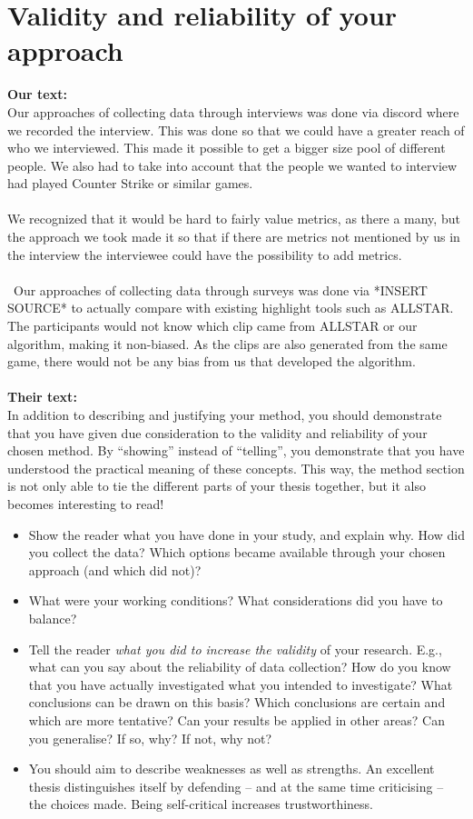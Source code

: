 \documentclass[a4paper,twoside]{bth}
\begin{document}
\section{Validity and reliability of your approach}
\textbf{Our text:}\\
Our approaches of collecting data through interviews was done via discord where we recorded the interview. This was done so that we could have a greater reach of who we interviewed. This made it possible to get a bigger size pool of different people. We also had to take into account that the people we wanted to interview had played Counter Strike or similar games.\\\\ We recognized that it would be hard to fairly value metrics, as there a many, but the approach we took made it so that if there are metrics not mentioned by us in the interview the interviewee could have the possibility to add metrics.   \\\\\
Our approaches of collecting data through surveys was done via *INSERT SOURCE* to actually compare with existing highlight tools such as ALLSTAR. The participants would not know which clip came from ALLSTAR or our algorithm, making it non-biased. As the clips are also generated from the same game, there would not be any bias from us that developed the algorithm. 
\\\\
\textbf{Their text:}\\
In addition to describing and justifying your method, you should demonstrate that you have given due consideration to the validity and reliability of your chosen method. By ``showing'' instead of ``telling'', you demonstrate that you have understood the practical meaning of these concepts. This way, the method section is not only able to tie the different parts of your thesis together, but it also becomes interesting to read!


\begin{itemize}
    \item Show the reader what you have done in your study, and explain why. How did you collect the data? Which options became available through your chosen approach (and which did not)?
    \item What were your working conditions? What considerations did you have to balance?
    \item Tell the reader \emph{what you did to increase the validity} of
    your research. E.g., what can you say about the reliability of data
    collection? How do you know that you have actually investigated what you 
    intended to investigate? What conclusions can be drawn on this basis? 
    Which conclusions are certain and which are more tentative? Can your 
    results be applied in other areas? Can you generalise? If so, why? If 
    not, why not?
    \item You should aim to describe weaknesses as well as strengths. An excellent thesis distinguishes itself by defending -- and at the same time criticising -- the choices made. Being self-critical increases trustworthiness.
\end{itemize}
\end{document}
